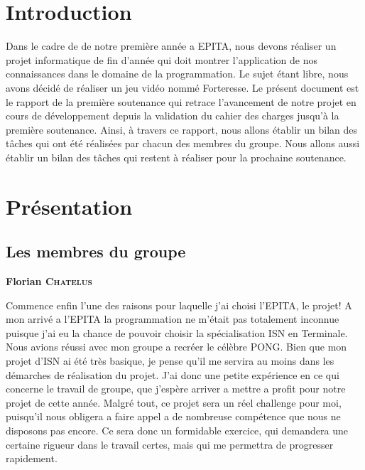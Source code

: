 \documentclass[a4paper, 12pt]{article}
\begin{document}
\begin{spacing}{1.0}
	\tableofcontents
\end{spacing}

\newpage
\section{Introduction}
Dans le cadre de de notre première année a EPITA, nous devons réaliser un projet informatique de fin d’année qui doit montrer l’application de nos connaissances dans le domaine de la programmation.
	Le sujet étant libre, nous avons décidé de réaliser un jeu vidéo nommé Forteresse.
	Le présent document est  le rapport de la première soutenance qui retrace l’avancement de notre projet en cours de développement depuis la validation du cahier des charges jusqu'à la première soutenance. Ainsi, à travers ce rapport, nous allons établir un bilan des tâches qui ont été réalisées par chacun des membres du groupe. Nous allons aussi établir un bilan  des tâches qui restent à  réaliser pour  la prochaine soutenance. 

\newpage

\section{Présentation}
	\subsection{Les membres du groupe}
	\parindent=0cm\textbf{Florian \textsc{Chatelus}}
	\smallbreak
	\par \parindent=0.5cm Commence enfin l'une des raisons pour laquelle j'ai choisi l'EPITA, le projet! A mon arrivé a l'EPITA la programmation ne m'était pas totalement inconnue puisque j'ai eu la chance de pouvoir choisir la spécialisation ISN en Terminale. Nous avions réussi avec mon groupe a recréer le célèbre PONG. Bien que mon projet d'ISN ai été très basique, je pense qu'il me servira au moins dans les démarches de réalisation du projet. J'ai donc une petite expérience en ce qui concerne le travail de groupe, que j'espère arriver a mettre a profit pour notre projet de cette année. Malgré tout, ce projet sera un réel challenge pour moi, puisqu'il nous obligera a faire appel a de nombreuse compétence que nous ne disposons pas encore. Ce sera donc un formidable exercice, qui demandera une certaine rigueur dans le travail certes, mais qui me permettra de progresser rapidement.\\
	
\end{document}
